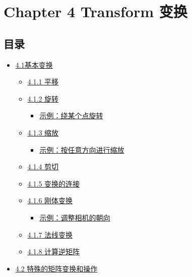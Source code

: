\documentclass[
  paper=a4,
  ,captions=tableheading
]{scrartcl}
\author{}
\date{}
\title{}
\author{}
\date{}
\providecommand{\tightlist}{%
  \setlength{\itemsep}{0pt}\setlength{\parskip}{0pt}}
\begin{document}
\section{Chapter 4 Transform
  变换}\label{chapter-4-transform-ux53d8ux6362}

\subsection{目录}\label{ux76eeux5f55}

\begin{itemize}
  \tightlist
  \item
        \hyperref[41ux57faux672cux53d8ux6362]{4.1基本变换}

        \begin{itemize}
          \tightlist
          \item
                \hyperref[411-ux5e73ux79fb]{4.1.1 平移}
          \item
                \hyperref[412-ux65cbux8f6c]{4.1.2 旋转}

                \begin{itemize}
                  \tightlist
                  \item
                        \hyperref[ux793aux4f8bux7ed5ux67d0ux4e2aux70b9ux65cbux8f6c]{示例：绕某个点旋转}
                \end{itemize}
          \item
                \hyperref[413-ux7f29ux653e]{4.1.3 缩放}

                \begin{itemize}
                  \tightlist
                  \item
                        \hyperref[ux793aux4f8bux6309ux4efbux610fux65b9ux5411ux8fdbux884cux7f29ux653e]{示例：按任意方向进行缩放}
                \end{itemize}
          \item
                \hyperref[414-ux526aux5207]{4.1.4 剪切}
          \item
                \hyperref[415-ux53d8ux6362ux7684ux8fdeux63a5]{4.1.5 变换的连接}
          \item
                \hyperref[416-ux521aux4f53ux53d8ux6362]{4.1.6 刚体变换}

                \begin{itemize}
                  \tightlist
                  \item
                        \hyperref[ux793aux4f8bux8c03ux6574ux76f8ux673aux7684ux671dux5411]{示例：调整相机的朝向}
                \end{itemize}
          \item
                \hyperref[417-ux6cd5ux7ebfux53d8ux6362]{4.1.7 法线变换}
          \item
                \hyperref[418-ux8ba1ux7b97ux9006ux77e9ux9635]{4.1.8 计算逆矩阵}
        \end{itemize}
  \item
        \hyperref[42-ux7279ux6b8aux7684ux77e9ux9635ux53d8ux6362ux548cux64cdux4f5c]{4.2
          特殊的矩阵变换和操作}


\end{itemize}
\end{document}
